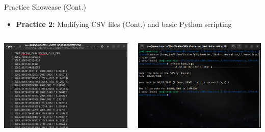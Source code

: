 \documentclass[12pt, aspectratio=169]{beamer}
\begin{document}
  \begin{frame}[t]{Practice Showcase (Cont.)}
    \begin{itemize}
      \item \textbf{Practice 2:} Modifying CSV files (Cont.) and basic Python
      scripting \vspace{2.5mm}
    \end{itemize}
    \begin{columns}
      \begin{column}{0.5\textwidth}
        \centering
        \includegraphics[width=\linewidth]{figures/2-3.png}
      \end{column}
      \begin{column}{0.5\textwidth}
        \centering
        \includegraphics[width=\linewidth]{figures/2-4.png}
      \end{column}
    \end{columns}
  \end{frame}
\end{document}
